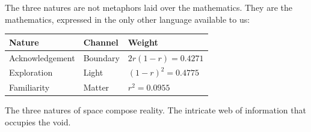 \documentclass[12pt]{article}
\begin{document}

The three natures are not metaphors laid over the mathematics. They are the
mathematics, expressed in the only other language available to us:

\begin{center}
\begin{tabular}{lll}
\hline
\textbf{Nature} & \textbf{Channel} & \textbf{Weight} \\
\hline
Acknowledgement & Boundary & $2r(1-r) = 0.4271$ \\
Exploration     & Light    & $(1-r)^2 = 0.4775$ \\
Familiarity     & Matter   & $r^2     = 0.0955$ \\
\hline
\end{tabular}
\end{center}

The three natures of space compose reality. The intricate web of information
that occupies the void.
\end{document}
